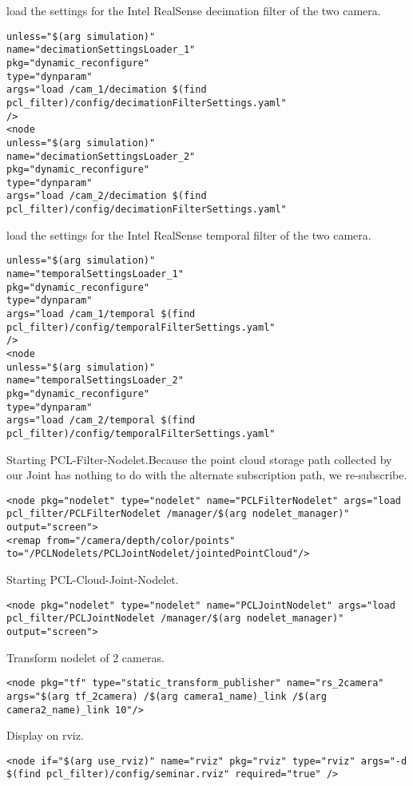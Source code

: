 load the settings for the Intel RealSense decimation filter of the two camera.\\
\begin{lstlisting}[caption={}]
unless="$(arg simulation)"
name="decimationSettingsLoader_1"
pkg="dynamic_reconfigure"
type="dynparam"
args="load /cam_1/decimation $(find pcl_filter)/config/decimationFilterSettings.yaml"
/>
<node
unless="$(arg simulation)"
name="decimationSettingsLoader_2"
pkg="dynamic_reconfigure"
type="dynparam"
args="load /cam_2/decimation $(find pcl_filter)/config/decimationFilterSettings.yaml"
\end{lstlisting}


load the settings for the Intel RealSense temporal filter of the two camera.\\
\begin{lstlisting}[caption={}]
unless="$(arg simulation)"
name="temporalSettingsLoader_1"
pkg="dynamic_reconfigure"
type="dynparam"
args="load /cam_1/temporal $(find pcl_filter)/config/temporalFilterSettings.yaml"
/>
<node
unless="$(arg simulation)"
name="temporalSettingsLoader_2"
pkg="dynamic_reconfigure"
type="dynparam"
args="load /cam_2/temporal $(find pcl_filter)/config/temporalFilterSettings.yaml"
\end{lstlisting}

Starting PCL-Filter-Nodelet.Because the point cloud storage path collected by our Joint has nothing to do with the alternate subscription path, we re-subscribe.\\
\begin{lstlisting}[caption={}]
<node pkg="nodelet" type="nodelet" name="PCLFilterNodelet" args="load pcl_filter/PCLFilterNodelet /manager/$(arg nodelet_manager)"
output="screen">
<remap from="/camera/depth/color/points" to="/PCLNodelets/PCLJointNodelet/jointedPointCloud"/>
\end{lstlisting}

Starting PCL-Cloud-Joint-Nodelet.\\
\begin{lstlisting}[caption={}]
<node pkg="nodelet" type="nodelet" name="PCLJointNodelet" args="load pcl_filter/PCLJointNodelet /manager/$(arg nodelet_manager)"
output="screen">
\end{lstlisting}

Transform nodelet of 2 cameras.\\
\begin{lstlisting}[caption={}]
<node pkg="tf" type="static_transform_publisher" name="rs_2camera" args="$(arg tf_2camera) /$(arg camera1_name)_link /$(arg camera2_name)_link 10"/>
\end{lstlisting}

Display on rviz.\\
\begin{lstlisting}[caption={}]
<node if="$(arg use_rviz)" name="rviz" pkg="rviz" type="rviz" args="-d $(find pcl_filter)/config/seminar.rviz" required="true" />
\end{lstlisting}
